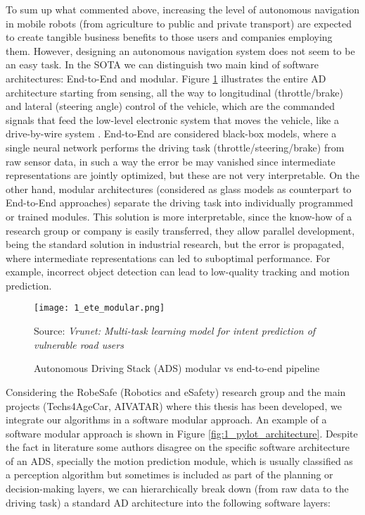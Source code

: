 To sum up what commented above, increasing the level of autonomous navigation in mobile robots (from agriculture to public and private transport) are expected to create tangible business benefits to those users and companies employing them. However, designing an autonomous navigation system does not seem to be an easy task. In the \ac{SOTA} we can distinguish two main kind of software architectures: End-to-End and modular. Figure \ref{fig:1_ete_modular} illustrates the entire \ac{AD} architecture starting from sensing, all the way to longitudinal (throttle/brake) and lateral (steering angle) control of the vehicle, which are the commanded signals that feed the low-level electronic system that moves the vehicle, like a drive-by-wire system \cite{arango2020drive}. End-to-End are considered black-box models, where a single neural network performs the driving task (throttle/steering/brake) from raw sensor data, in such a way the error be may vanished since intermediate representations are jointly optimized, but these are not very interpretable. On the other hand, modular architectures (considered as glass models as counterpart to End-to-End approaches) separate the driving task into individually programmed or trained modules. This solution is more interpretable, since the know-how of a research group or company is easily transferred, they allow parallel development, being the standard solution in industrial research, but the error is propagated, where intermediate representations can led to suboptimal performance. For example, incorrect object detection can lead to low-quality tracking and motion prediction.

\begin{figure}[h]
	\centering
	\texttt{[image: 1\_ete\_modular.png]}
	\caption{Autonomous Driving Stack (ADS) modular vs end-to-end pipeline}
	Source: \textit{Vrunet: Multi-task learning model for intent prediction of vulnerable road users} \cite{ranga2020vrunet}
	\label{fig:1_ete_modular}
\end{figure}

Considering the RobeSafe (Robotics and eSafety) research group and the main projects (Techs4AgeCar, AIVATAR) where this thesis has been developed, we integrate our algorithms in a software modular approach. An example of a software modular approach is shown in Figure \ref{fig:1_pylot_architecture}. Despite the fact in literature some authors disagree on the specific software architecture of an \ac{ADS}, specially the motion prediction module, which is usually classified as a perception algorithm but sometimes is included as part of the planning or decision-making layers, we can hierarchically break down (from raw data to the driving task) a standard \ac{AD} architecture into the following software layers:

